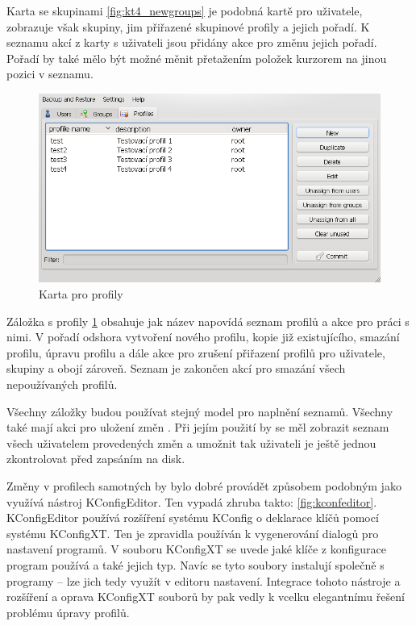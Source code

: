 Karta se skupinami \ref{fig:kt4_newgroups} je podobná kartě pro uživatele, zobrazuje však skupiny, jim přiřazené skupinové profily a jejich pořadí. K seznamu akcí z karty s uživateli jsou přidány akce pro změnu jejich pořadí. Pořadí by také mělo být možné měnit přetažením položek kurzorem na jinou pozici v seznamu.

\begin{figure}[h]
    \centering
    \includegraphics[width=13cm]{obrazky/navrh-profiles-fixd.png}
    \caption{Karta pro profily}
    \label{fig:kt4_newprofiles}
\end{figure}

Záložka s profily \ref{fig:kt4_newprofiles} obsahuje jak název napovídá seznam profilů a akce pro práci s nimi. V pořadí odshora vytvoření nového profilu, kopie již existujícího, smazání profilu, úpravu profilu a dále akce pro zrušení přiřazení profilů pro uživatele, skupiny a obojí zároveň. Seznam je zakončen akcí pro smazání všech nepoužívaných profilů.

Všechny záložky budou používat stejný model pro naplnění seznamů. Všechny také mají akci pro uložení změn . Při jejím použití by se měl zobrazit seznam všech uživatelem provedených změn a umožnit tak uživateli je ještě jednou zkontrolovat před zapsáním na disk.

Změny v profilech samotných by bylo dobré provádět způsobem podobným jako využívá nástroj KConfigEditor. Ten vypadá zhruba takto: \ref{fig:kconfeditor}. KConfigEditor používá rozšíření systému KConfig o deklarace klíčů pomocí systému KConfigXT. Ten je zpravidla používán k vygenerování dialogů pro nastavení programů. V souboru KConfigXT se uvede jaké klíče z konfigurace program používá a také jejich typ. Navíc se tyto soubory instalují společně s programy -- lze jich tedy využít v editoru nastavení. Integrace tohoto nástroje a rozšíření a oprava KConfigXT souborů by pak vedly k vcelku elegantnímu řešení problému úpravy profilů.

